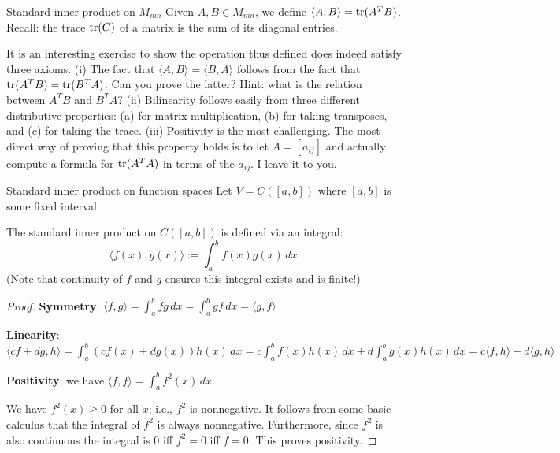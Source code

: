 \begin{frame}{Standard inner product on $M_{mn}$}
Given $A, B\in M_{mn}$, we define $\langle A, B\rangle=\operatorname{tr} (A^TB)$. Recall: the trace $\operatorname{tr}(C)$ of a matrix is the sum of its diagonal entries. 

It is an interesting exercise to show the operation thus defined does indeed satisfy three axioms. 
\bpause
(i) The fact that $\langle A,B\rangle=\langle B,A \rangle$ follows from the fact that $\operatorname{tr}(A^TB)=\operatorname{tr}(B^TA)$. Can you prove the latter? Hint: what is the relation between $A^TB$ and $B^TA$? 
\bpause
(ii) Bilinearity follows easily from \alert{three} different distributive properties: (a) for matrix multiplication, (b) for taking transposes, and (c) for taking the trace.
\bpause
(iii) Positivity is the most challenging. The most direct way of proving that this property holds is to let $A=[a_{ij}]$ and actually compute a formula for $\operatorname{tr}(A^TA)$ in terms of the $a_{ij}$. I leave it to you.   
\end{frame}
\begin{frame}{Standard inner product on function spaces}
Let $V=C([a,b])$ where $[a,b]$ is some fixed interval. 

The \alert{standard inner product} on $C([a,b])$ is defined via an integral:
\[
\langle f(x), g(x)\rangle:=\int_a^b f(x)g(x) \, dx.
\]
(Note that continuity of $f$ and $g$ ensures this integral exists and is finite!) 
\pause
\begin{proof}
{\bf Symmetry}: $\langle f,g\rangle=\int_a^b fg\, dx=\int_a^b gf\, dx=\langle g,f\rangle$

{\bf Linearity}: $\langle cf+dg,h\rangle=\int_a^b(cf(x)+dg(x))h(x)\, dx=c\int_a^bf(x)h(x)\, dx+d\int_a^bg(x)h(x)\, dx=c\langle f,h\rangle + d\langle g,h \rangle$
\pause

{\bf Positivity}: we have $\langle f, f\rangle=\int_a^b f^2(x)\, dx$. 

We have $f^2(x)\geq 0$ for all $x$; i.e., $f^2$ is nonnegative. It follows from some basic calculus that the integral of $f^2$ is always nonnegative. Furthermore, since $f^2$ is also \alert{continuous} the integral is 0 iff $f^2=0$ iff $f=0$.  This proves positivity. 
\end{proof}

\end{frame}
